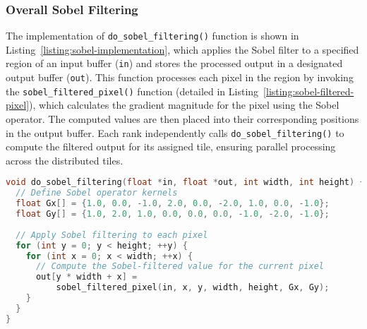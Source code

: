 \FloatBarrier
\subsubsection{Overall Sobel Filtering}
The implementation of \texttt{do\_sobel\_filtering()} function is shown in Listing~\ref{listing:sobel-implementation}, which applies the Sobel filter to a specified region of an input buffer (\texttt{in}) and stores the processed output in a designated output buffer (\texttt{out}). This function processes each pixel in the region by invoking the \texttt{sobel\_filtered\_pixel()} function (detailed in Listing~\ref{listing:sobel-filtered-pixel}), which calculates the gradient magnitude for the pixel using the Sobel operator. The computed values are then placed into their corresponding positions in the output buffer. Each rank independently calls \texttt{do\_sobel\_filtering()} to compute the filtered output for its assigned tile, ensuring parallel processing across the distributed tiles.

\begin{lstlisting}[caption={\textbf{Implementation of the Sobel operation for a given region.}},label={listing:sobel-implementation},float=htbp,style=mystyle,language=C++]
void do_sobel_filtering(float *in, float *out, int width, int height) {
  // Define Sobel operator kernels
  float Gx[] = {1.0, 0.0, -1.0, 2.0, 0.0, -2.0, 1.0, 0.0, -1.0};
  float Gy[] = {1.0, 2.0, 1.0, 0.0, 0.0, 0.0, -1.0, -2.0, -1.0};
  
  // Apply Sobel filtering to each pixel
  for (int y = 0; y < height; ++y) {
    for (int x = 0; x < width; ++x) {
      // Compute the Sobel-filtered value for the current pixel
      out[y * width + x] =
          sobel_filtered_pixel(in, x, y, width, height, Gx, Gy);
    }
  }
}
\end{lstlisting}